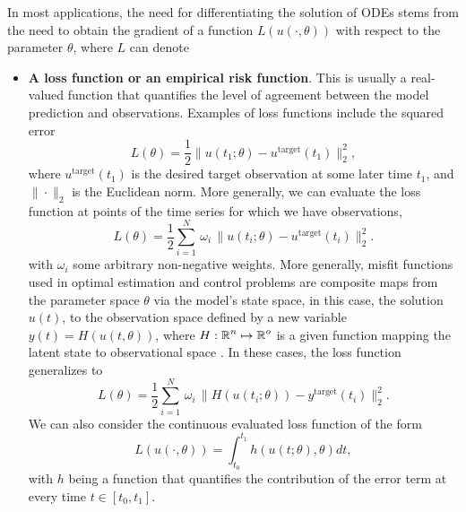 In most applications, the need for differentiating the solution of ODEs stems from the need to obtain the gradient of a function $L(u(\cdot, \theta))$ with respect to the parameter $\theta$, where $L$ can denote
\begin{itemize}
    \item \textbf{A loss function or an empirical risk function}. This is usually a real-valued function that quantifies the level of agreement between the model prediction and observations. Examples of loss functions include the squared error
    \begin{equation}
         L(\theta) = \frac{1}{2} \| u(t_1; \theta) - u^{\text{target}}(t_1) \|_2^2,
         \label{eq:quadratic-loss-function}
    \end{equation}
    where $u^{\text{target}}(t_1)$ is the desired target observation at some later time $t_1$, and $\| \cdot \|_2$ is the Euclidean norm.
    More generally, we can evaluate the loss function at points of the time series for which we have observations, 
    \begin{equation}
        L(\theta) 
        = 
        \frac{1}{2} \sum_{i=1}^N 
        \, \omega_i \,
        \| u(t_i; \theta) - u^{\text{target}}(t_i) \|_2^2.
    \end{equation}
    with $\omega_i$ some arbitrary non-negative weights.
    More generally, misfit functions used in optimal estimation and control problems are composite maps from the parameter space $\theta$ via the model's state space, in this case, the solution $u(t)$, to the observation space defined by a new variable $y(t) = H(u(t, \theta))$, where $H: \operatorname{\mathbb{R}}^n \mapsto \operatorname{\mathbb{R}}^o$ is a given function mapping the latent state to observational space \cite{1975-Bryson-Ho-optimal-control}. 
    In these cases, the loss function generalizes to 
    \begin{equation}
        L(\theta) 
        =
        \frac{1}{2} 
        \sum_{i=1}^N
        \, \omega_i \,
        \| H(u(t_i; \theta)) - y^{\text{target}}(t_i) \|_2^2.
        \label{eq:loss-state-observation}
    \end{equation}
    We can also consider the continuous evaluated loss function of the form
    \begin{equation}
         L(u(\cdot, \theta)) = \int_{t_0}^{t_1} h( u(t;\theta), \theta)  dt, 
         \label{eq:integrated-loss-function}
    \end{equation}
    with $h$ being a function that quantifies the contribution of the error term at every time $t \in [t_0, t_1]$. 

\end{itemize}

